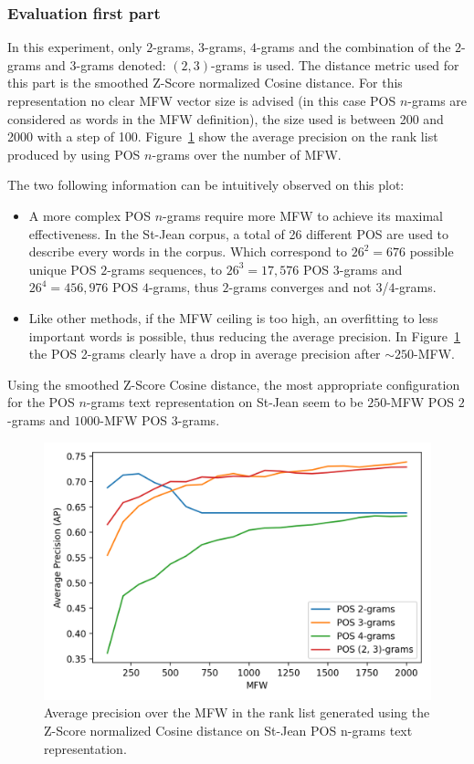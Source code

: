 \subsubsection{Evaluation first part}

In this experiment, only $2$-grams, $3$-grams, $4$-grams and the combination of the $2$-grams and $3$-grams denoted: $(2, 3)$-grams is used.
The distance metric used for this part is the smoothed Z-Score normalized Cosine distance.
For this representation no clear MFW vector size is advised (in this case POS $n$-grams are considered as words in the MFW definition), the size used is between 200 and 2000 with a step of 100.
Figure~\ref{fig:pos_ngrams} show the average precision on the rank list produced by using POS $n$-grams over the number of MFW.

The two following information can be intuitively observed on this plot:
\begin{itemize}
  \item
  A more complex POS $n$-grams require more MFW to achieve its maximal effectiveness.
  In the St-Jean corpus, a total of 26 different POS are used to describe every words in the corpus.
  Which correspond to $26^2 = 676$ possible unique POS $2$-grams sequences, to $26^3 = 17,576$ POS $3$-grams and $26^4 = 456,976$ POS $4$-grams, thus $2$-grams converges and not $3$/$4$-grams.
  \item
  Like other methods, if the MFW ceiling is too high, an overfitting to less important words is possible, thus reducing the average precision.
  In Figure~\ref{fig:pos_ngrams} the POS 2-grams clearly have a drop in average precision after $\sim 250$-MFW.
\end{itemize}

Using the smoothed Z-Score Cosine distance, the most appropriate configuration for the POS $n$-grams text representation on St-Jean seem to be $250$-MFW POS $2$-grams and $1000$-MFW POS $3$-grams.

\begin{figure}
  \centering
  \caption{Average precision over the MFW in the rank list generated using the Z-Score normalized Cosine distance on St-Jean POS n-grams text representation.}
  \label{fig:pos_ngrams}
  \includegraphics[width=\linewidth]{img/pos_ngrams.png}
\end{figure}

